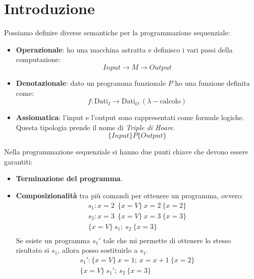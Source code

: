 \chapter{Introduzione}
Possiamo definire diverse semantiche per la programmazione sequenziale:
\begin{itemize}
    \item \textbf{Operazionale}: ho una macchina astratta e definisco i vari
          passi della computazione:
          \begin{equation}
              Input \longrightarrow M \longrightarrow Output
          \end{equation}
    \item \textbf{Denotazionale}: dato un programma funzionale $P$ ho una
          funzione definita come:
          \begin{equation}
              f: \text{Dati}_{I} \to \text{Dati}_{O} \ ( \lambda-\text{calcolo})
          \end{equation}
    \item \textbf{Assiomatica}: l'input e l'output sono rappresentati come
          formule logiche. Questa tipologia prende il nome di \textit{Triple di
              Hoare}.
          \begin{equation}
              \{Input\} P \{Output\}
          \end{equation}
\end{itemize}
Nella programmazione sequenziale si hanno due punti chiave che devono essere
garantiti:
\begin{itemize}
    \item \textbf{Terminazione del programma}.
    \item \textbf{Composizionalità} tra più comandi per ottenere un programma,
          ovvero:
          \begin{equation}
              \begin{aligned}
                  s_1: x = 2 \ \ \{x = V\} \ x = 2 \ \{x = 2\} \\
                  s_2: x = 3 \ \ \{x = V\} \ x = 3 \ \{x = 3\} \\
                  \{x = V\} \ s_1; \ s_2 \ \{x = 3\}           \\
              \end{aligned}
          \end{equation}
          Se esiste un programma $s_1'$ tale che mi permette di ottenere lo
          stesso risultato si $s_1$, allora posso sostituirlo a $s_1$.
          \begin{equation}
              \begin{aligned}
                  s_1': \{x = V\} \ x = 1; \ x = x + 1  \ \{x = 2\} \\
                  \{x = V\} \ s_1'; \ s_2 \ \{x = 3\}               \\
              \end{aligned}
          \end{equation}
\end{itemize}

